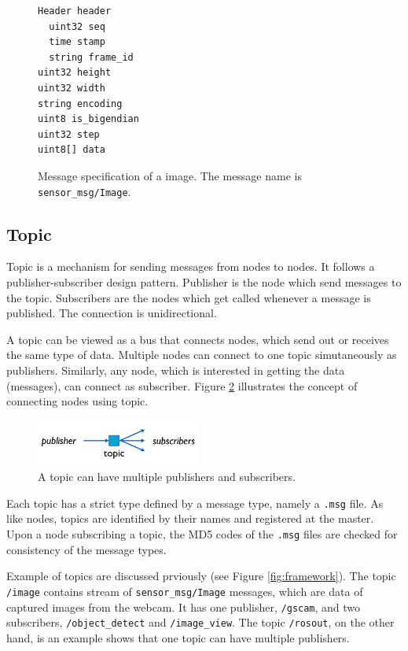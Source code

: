 \documentclass[a4paper, 10pt, conference]{ieeeconf}       %
\begin{document}
\begin{figure}[htpb]
  \centering
\begin{Verbatim}[frame=single]
Header header 
  uint32 seq 
  time stamp 
  string frame_id 
uint32 height 
uint32 width 
string encoding 
uint8 is_bigendian 
uint32 step 
uint8[] data
\end{Verbatim}
  \caption{Message specification of a image. The message name is \texttt{sensor\_msg/Image}.}
  \label{fig:message}
\end{figure}

\subsection{Topic}

Topic is a mechanism for sending messages from nodes to nodes. It follows a publisher-subscriber design pattern. Publisher is the node which send messages to the topic. Subscribers are the nodes which get called whenever a message is published. The connection is unidirectional.

A topic can be viewed as a bus that connects nodes, which send out or receives the same type of data. Multiple nodes can connect to one topic simutaneously as publishers. Similarly, any node, which is interested in getting the data (messages), can connect as subscriber. Figure 
\ref{fig:topic} illustrates the concept of connecting nodes using topic.

\begin{figure}[htpb]
  \centering
  \includegraphics[width=0.48\textwidth]{topic}
  \caption{A topic can have multiple publishers and subscribers.}
  \label{fig:topic}
\end{figure}

Each topic has a strict type defined by a message type, namely a \texttt{.msg} file. As like nodes, topics are identified by their names and registered at the master. Upon a node subscribing a topic, the MD5 codes of the \texttt{.msg} files are checked for consistency of the message types.

Example of topics are discussed prviously (see Figure \ref{fig:framework}). The topic \texttt{/image} contains stream of \texttt{sensor\_msg/Image} messages, which are data of captured images from the webcam. It has one publisher, \texttt{/gscam}, and two subscribers, \texttt{/object\_detect} and \texttt{/image\_view}. The topic \texttt{/rosout}, on the other hand, is an example shows that one topic can have multiple publishers.
\end{document}
